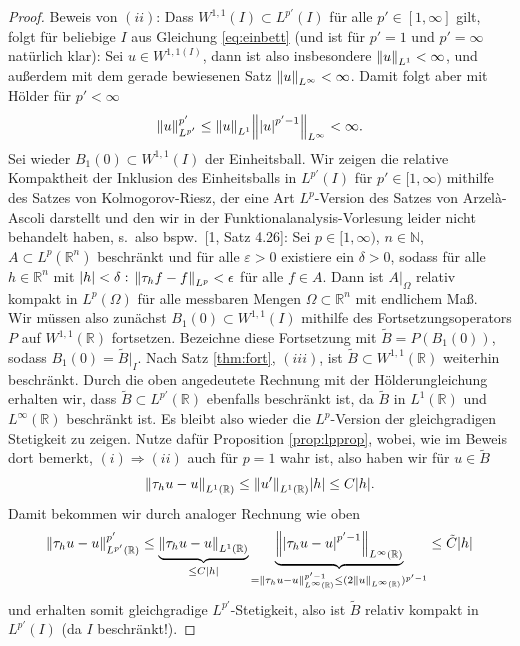 \documentclass[twoside]{article}
\theoremstyle{definition}
\begin{document}
\begin{proof}
Beweis von $(ii)$: Dass $W^{1,1}(I) \subset L^{p'}(I)$ für alle $p' \in [1,\infty]$ gilt, folgt für beliebige $I$ aus Gleichung \ref{eq:einbett} (und ist für $p'=1$ und $p' = \infty$ natürlich klar): Sei $u \in W^{1,1(I)}$, dann ist also insbesondere $\norm{u}_{L^{1}}< \infty$, und außerdem mit dem gerade bewiesenen Satz $\norm{u}_{L^\infty} < \infty$. Damit folgt aber mit Hölder für $p' < \infty$
\begin{align*}
\norm{u}_{L^{p'}}^{p'} \leq \norm{u}_{L^1} \norm{\abs{u}^{p'-1}}_{L^\infty} < \infty.
\end{align*}
Sei wieder $B_1(0)\subset W^{1,1}(I)$ der Einheitsball. Wir zeigen die relative Kompaktheit der Inklusion des Einheitsballs in $L^{p'}(I)$ für $p' \in [1,\infty)$ mithilfe des Satzes von Kolmogorov-Riesz, der eine Art $L^p$-Version des Satzes von Arzel{\`a}-Ascoli darstellt und den wir in der Funktionalanalysis-Vorlesung leider nicht behandelt haben, s.\ also bspw.\ [1, Satz 4.26]: Sei $p \in [1,\infty)$, $n \in \mathbb{N}$, $A \subset L^p(\mathbb{R}^n)$ beschränkt und für alle $\varepsilon > 0$ existiere ein $\delta > 0$, sodass für alle $h \in \mathbb{R}^n$ mit $\abs{h}< \delta:$ $\norm{\tau_h f - f}_{L^p}< \epsilon$ für alle $f \in A$. Dann ist $A|_\Omega$ relativ kompakt in $L^p(\Omega)$ für alle messbaren Mengen $\Omega \subset \mathbb{R}^n$ mit endlichem Maß.\\
Wir müssen also zunächst $B_1(0)\subset W^{1,1}(I)$ mithilfe des Fortsetzungsoperators $P$ auf  $W^{1,1}(\mathbb{R})$ fortsetzen. Bezeichne diese Fortsetzung mit $\tilde{B} = P(B_1(0))$, sodass $B_1(0) = \tilde{B}|_I$. Nach Satz \ref{thm:fort}, $(iii)$, ist $\tilde{B} \subset W^{1,1}(\mathbb{R})$ weiterhin beschränkt. Durch die oben angedeutete Rechnung mit der Hölderungleichung erhalten wir, dass $\tilde{B} \subset L^{p'}(\mathbb{R})$ ebenfalls beschränkt ist, da $\tilde{B}$ in $L^1(\mathbb{R})$ und $L^\infty(\mathbb{R})$ beschränkt ist. Es bleibt also wieder die $L^p$-Version der gleichgradigen Stetigkeit zu zeigen. Nutze dafür Proposition  \ref{prop:lpprop}, wobei, wie im Beweis dort bemerkt, $(i) \Rightarrow (ii)$ auch für $p=1$ wahr ist, also haben wir für $u \in \tilde{B}$
\begin{align*}
\norm{\tau_h u - u}_{L^1(\mathbb{R})} \leq \norm{u'}_{L^1(\mathbb{R})} \abs{h} \leq C \abs{h}. 
\end{align*}
Damit bekommen wir durch analoger Rechnung wie oben
\begin{align*}
\norm{\tau_h u - u}_{L^{p'}(\mathbb{R})}^{p'} \leq \underbrace{\norm{\tau_h u - u}_{L^1(\mathbb{R})}}_{\leq C \abs{h}} \underbrace{\norm{\abs{\tau_h u - u}^{p' - 1}}_{L^\infty(\mathbb{R})}}_{= \norm{\tau_h u - u}_{L^\infty(\mathbb{R})}^{p' - 1} \leq (2 \norm{u}_{L^\infty(\mathbb{R})})^{p'-1}} \leq \tilde{C} \abs{h}
\end{align*}
und erhalten somit gleichgradige $L^{p'}$-Stetigkeit, also ist $\tilde{B}$ relativ kompakt in $L^{p'}(I)$ (da $I$ beschränkt!).
\end{proof}
\end{document}
